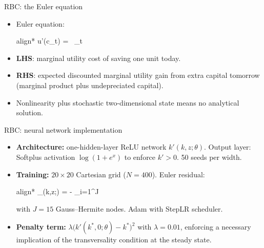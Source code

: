 \documentclass[aspectratio=169,10pt]{beamer}
\newcommand{\emphcolor}[1]{\textbf{\textcolor{emphcolorval}{#1}}}
\begin{document}
\begin{frame}{RBC: the Euler equation}
	\begin{itemize}
		\item Euler equation:
		\begin{empheq}[box=\tcbhighmath]{align*}
			u'(c_t) = \beta\, _t\!
		\end{empheq}
		\item \emphcolor{LHS}: marginal utility cost of saving one unit today.
		\item \emphcolor{RHS}: expected discounted marginal utility gain from extra capital tomorrow (marginal product plus undepreciated capital).
		\item Nonlinearity plus stochastic two-dimensional state means no analytical solution.
	\end{itemize}
\end{frame}

\begin{frame}[label=rbc-impl]{RBC: neural network implementation}
	\begin{itemize}
		\item \emphcolor{Architecture:} one-hidden-layer ReLU network $k'(k,z;\theta)$. Output layer: Softplus activation $\log(1+e^x)$ to enforce $k' > 0$. 50 seeds per width.
		\item \emphcolor{Training:} $20 \times 20$ Cartesian grid ($N = 400$). Euler residual:
		\begin{empheq}[box=\tcbhighmath]{align*}
			\ell_{}(k,z;\theta) =  - \beta \sum_{i=1}^J  
		\end{empheq}
		with $J = 15$ Gauss--Hermite nodes. Adam with StepLR scheduler.
		\item \emphcolor{Penalty term:} $\lambda\big(k'(k^*,0;\theta) - k^*\big)^2$ with $\lambda = 0.01$, enforcing a necessary implication of the transversality condition at the steady state.
	\end{itemize}
	\vspace{0.05in}
	\hfill\hyperlink{rbc-param}{}
\end{frame}
\end{document}
